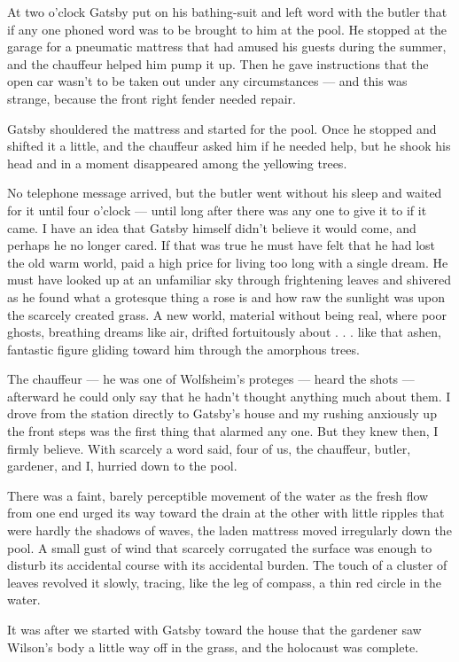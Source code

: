 \documentclass{znotebook}
\begin{document}
At two o'clock Gatsby put on his bathing-suit and left word with the butler that if any one phoned word was to be brought to him at the pool. He stopped at the garage for a pneumatic mattress that had amused his guests during the summer, and the chauffeur helped him pump it up. Then he gave instructions that the open car wasn't to be taken out under any circumstances — and this was strange, because the front right fender needed repair.

Gatsby shouldered the mattress and started for the pool. Once he stopped and shifted it a little, and the chauffeur asked him if he needed help, but he shook his head and in a moment disappeared among the yellowing trees.

No telephone message arrived, but the butler went without his sleep and waited for it until four o'clock — until long after there was any one to give it to if it came. I have an idea that Gatsby himself didn't believe it would come, and perhaps he no longer cared. If that was true he must have felt that he had lost the old warm world, paid a high price for living too long with a single dream. He must have looked up at an unfamiliar sky through frightening leaves and shivered as he found what a grotesque thing a rose is and how raw the sunlight was upon the scarcely created grass. A new world, material without being real, where poor ghosts, breathing dreams like air, drifted fortuitously about . . . like that ashen, fantastic figure gliding toward him through the amorphous trees.

The chauffeur — he was one of Wolfsheim's proteges — heard the shots — afterward he could only say that he hadn't thought anything much about them. I drove from the station directly to Gatsby's house and my rushing anxiously up the front steps was the first thing that alarmed any one. But they knew then, I firmly believe. With scarcely a word said, four of us, the chauffeur, butler, gardener, and I, hurried down to the pool.

There was a faint, barely perceptible movement of the water as the fresh flow from one end urged its way toward the drain at the other with little ripples that were hardly the shadows of waves, the laden mattress moved irregularly down the pool. A small gust of wind that scarcely corrugated the surface was enough to disturb its accidental course with its accidental burden. The touch of a cluster of leaves revolved it slowly, tracing, like the leg of compass, a thin red circle in the water.

It was after we started with Gatsby toward the house that the gardener saw Wilson's body a little way off in the grass, and the holocaust was complete.
\end{document}
